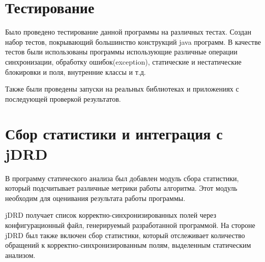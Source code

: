 \FloatBarrier
\section{Тестирование}
Было проведено тестирование данной программы на различных тестах. Создан набор тестов, покрывающий большинство конструкций java программ. В качестве тестов были использованы программы использующие различные операции синхронизации, обработку ошибок(exception), статические и нестатические блокировки и поля, внутренние классы и т.д.

Также были проведены запуски на реальных библиотеках и приложениях с последующей проверкой результатов.

\FloatBarrier
\section{Сбор статистики и интеграция с jDRD}
В программу статического анализа был добавлен модуль сбора статистики, который подсчитывает различные метрики работы алгоритма. Этот модуль необходим для оценивания результата работы программы.

jDRD получает список корректно-синхронизированных полей через конфигурационный файл, генерируемый разработанной программой.
На стороне jDRD был также включен сбор статистики, который отслеживает количество обращений к корректно-синхронизированным полям, выделенным статическим анализом.


\FloatBarrier
